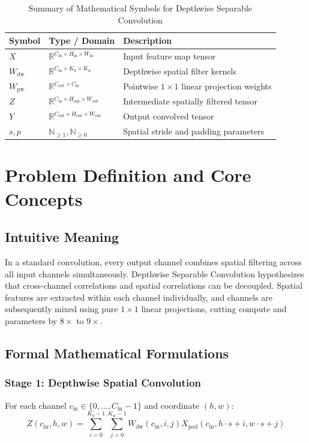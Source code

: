 \documentclass[11pt,a4paper]{article}
\theoremstyle{definition}
\begin{document}
\begin{table}[h]
\centering
\caption{Summary of Mathematical Symbols for Depthwise Separable Convolution}
\begin{tabular}{lll}
\toprule
\textbf{Symbol} & \textbf{Type / Domain} & \textbf{Description} \\
\midrule
$X$ & $\mathbb{R}^{C_{\text{in}} \times H_{\text{in}} \times W_{\text{in}}}$ & Input feature map tensor \\
$W_{\text{dw}}$ & $\mathbb{R}^{C_{\text{in}} \times K_h \times K_w}$ & Depthwise spatial filter kernels \\
$W_{\text{pw}}$ & $\mathbb{R}^{C_{\text{out}} \times C_{\text{in}}}$ & Pointwise $1 \times 1$ linear projection weights \\
$Z$ & $\mathbb{R}^{C_{\text{in}} \times H_{\text{out}} \times W_{\text{out}}}$ & Intermediate spatially filtered tensor \\
$Y$ & $\mathbb{R}^{C_{\text{out}} \times H_{\text{out}} \times W_{\text{out}}}$ & Output convolved tensor \\
$s, p$ & $\mathbb{N}_{\ge 1}, \mathbb{N}_{\ge 0}$ & Spatial stride and padding parameters \\
\bottomrule
\end{tabular}
\end{table}

\section{Problem Definition and Core Concepts}

\subsection{Intuitive Meaning}
In a standard convolution, every output channel combines spatial filtering across all input channels simultaneously. Depthwise Separable Convolution hypothesizes that cross-channel correlations and spatial correlations can be decoupled. Spatial features are extracted within each channel individually, and channels are subsequently mixed using pure $1 \times 1$ linear projections, cutting compute and parameters by $8\times$ to $9\times$.

\subsection{Formal Mathematical Formulations}

\subsubsection{Stage 1: Depthwise Spatial Convolution}
For each channel $c_{\text{in}} \in \{0, \dots, C_{\text{in}}-1\}$ and coordinate $(h, w)$:
\begin{equation}
Z(c_{\text{in}}, h, w) = \sum_{i=0}^{K_h-1} \sum_{j=0}^{K_w-1} W_{\text{dw}}(c_{\text{in}}, i, j) X_{\text{pad}}(c_{\text{in}}, h \cdot s + i, w \cdot s + j)
\end{equation}
\end{document}
